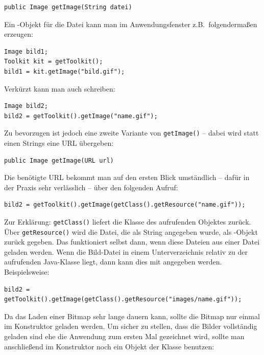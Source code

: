 \begin{lstlisting}
public Image getImage(String datei)
\end{lstlisting}

Ein -Objekt für die Datei  kann man im
Anwendungsfenster z.B.\ folgendermaßen erzeugen:

\begin{lstlisting}
Image bild1;
Toolkit kit = getToolkit();
bild1 = kit.getImage("bild.gif");
\end{lstlisting}

Verkürzt kann man auch schreiben:

\begin{lstlisting}
Image bild2;
bild2 = getToolkit().getImage("name.gif");
\end{lstlisting}

Zu bevorzugen ist jedoch eine zweite Variante von \lstinline|getImage()| – dabei
wird statt einen Strings eine URL übergeben:

\begin{lstlisting}
public Image getImage(URL url)
\end{lstlisting}

Die benötigte URL bekommt man auf den ersten Blick umständlich – dafür in der
Praxis sehr verlässlich – über den folgenden Aufruf:

\begin{lstlisting}
bild2 = getToolkit().getImage(getClass().getResource("name.gif"));
\end{lstlisting}

Zur Erklärung: \lstinline|getClass()| liefert die Klasse des aufrufenden
Objektes zurück. Über \lstinline|getResource()| wird die Datei, die als
String angegeben wurde, als -Objekt zurück gegeben. Das
funktioniert selbst dann, wenn diese Dateien aus einer  Datei
geladen werden. Wenn die Bild-Datei in einem Unterverzeichnis relativ zu der
aufrufenden Java-Klasse liegt, dann kann dies mit angegeben werden.
Beispielsweise:

\begin{lstlisting}
bild2 = getToolkit().getImage(getClass().getResource("images/name.gif"));
\end{lstlisting}

Da das Laden einer Bitmap sehr lange dauern kann, sollte die Bitmap nur einmal
im Konstruktor geladen werden. Um sicher zu stellen, dass die Bilder
vollständig geladen sind ehe die Anwendung zum ersten Mal gezeichnet wird,
sollte man anschließend im Konstruktor noch ein Objekt der Klasse
 benutzen:

